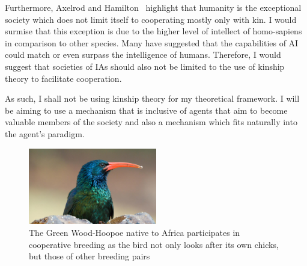 \documentclass[]{final_report}
\begin{document}
Furthermore, Axelrod and Hamilton~\cite{evolution_of_cooperation} highlight that humanity is the exceptional society which does not limit itself to cooperating mostly only with kin. I would surmise that this exception is due to the higher level of intellect of homo-sapiens in comparison to other species. Many have suggested that the capabilities of AI could match or even surpass the intelligence of humans. Therefore, I would suggest that societies of IAs should also not be limited to the use of kinship theory to facilitate cooperation.\par
As such, I shall not be using kinship theory for my theoretical framework. I will be aiming to use a  mechanism that is inclusive of agents that aim to become valuable members of the society and also a mechanism which fits naturally into the agent's paradigm. 
\begin{figure}
	\center
	\includegraphics[width=0.5\textwidth]{green-wood-hoopoe.jpg}
	\caption{The Green Wood-Hoopoe native to Africa participates in cooperative breeding as the bird not only looks after its own chicks, but those of other breeding pairs~\cite{hoopoe}}
	\label{fig:hoopoe}
\end{figure}
\end{document}

